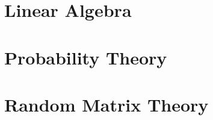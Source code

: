 \documentclass{book}
\begin{document}
\tableofcontents

\chapter{Linear Algebra}






\chapter{Probability Theory}








\chapter{Random Matrix Theory}







\end{document}
